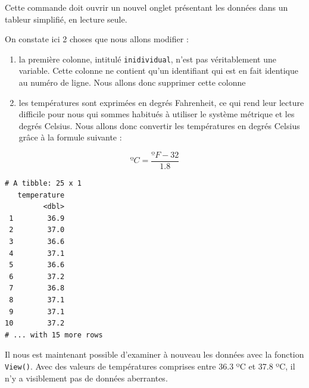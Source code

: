 \documentclass[a4paperpaper,]{article}
\newenvironment{Shaded}{\begin{snugshade}}{\end{snugshade}}
\newcommand{\CommentTok}[1]{\textcolor[rgb]{0.54,0.53,0.53}{#1}}
\newcommand{\DataTypeTok}[1]{\textcolor[rgb]{0.00,0.34,0.68}{#1}}
\newcommand{\DecValTok}[1]{\textcolor[rgb]{0.69,0.50,0.00}{#1}}
\newcommand{\FloatTok}[1]{\textcolor[rgb]{0.69,0.50,0.00}{#1}}
\newcommand{\KeywordTok}[1]{\textcolor[rgb]{0.12,0.11,0.11}{\textbf{#1}}}
\newcommand{\NormalTok}[1]{\textcolor[rgb]{0.12,0.11,0.11}{#1}}
\newcommand{\OperatorTok}[1]{\textcolor[rgb]{0.12,0.11,0.11}{#1}}
\newcommand{\StringTok}[1]{\textcolor[rgb]{0.75,0.01,0.01}{#1}}
\providecommand{\tightlist}{%
  \setlength{\itemsep}{0pt}\setlength{\parskip}{0pt}}
\begin{document}
Cette commande doit ouvrir un nouvel onglet présentant les données dans un tableur simplifié, en lecture seule.

On constate ici 2 choses que nous allons modifier :

\begin{enumerate}
\def\labelenumi{\arabic{enumi}.}
\tightlist
\item
  la première colonne, intitulé \texttt{inidividual}, n'est pas véritablement une variable. Cette colonne ne contient qu'un identifiant qui est en fait identique au numéro de ligne. Nous allons donc supprimer cette colonne
\item
  les températures sont exprimées en degrés Fahrenheit, ce qui rend leur lecture difficile pour nous qui sommes habitués à utiliser le système métrique et les degrés Celsius. Nous allons donc convertir les températures en degrés Celsius grâce à la formule suivante :
\end{enumerate}

\[ºC = \frac{ºF - 32}{1.8}\]

\begin{Shaded}
\end{Shaded}

\begin{verbatim}
# A tibble: 25 x 1
   temperature
         <dbl>
 1        36.9
 2        37.0
 3        36.6
 4        37.1
 5        36.6
 6        37.2
 7        36.8
 8        37.1
 9        37.1
10        37.2
# ... with 15 more rows
\end{verbatim}

Il nous est maintenant possible d'examiner à nouveau les données avec la fonction \texttt{View()}. Avec des valeurs de températures comprises entre 36.3 ºC et 37.8 ºC, il n'y a visiblement pas de données aberrantes.
\end{document}
